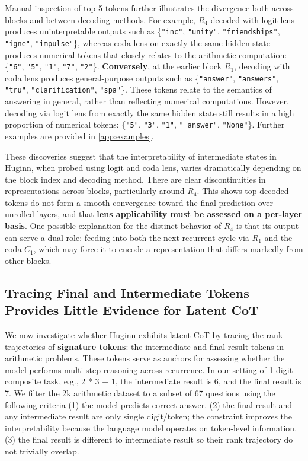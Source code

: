 \documentclass{article} %
\begin{document}
Manual inspection of top-5 tokens further illustrates the divergence both across blocks and between decoding methods. For example, $R_4$ decoded with logit lens produces uninterpretable outputs such as \{\texttt{"inc"}, \texttt{"unity"}, \texttt{"friendships"}, \texttt{"igne"}, \texttt{"impulse"}\}, whereas coda lens on exactly the same hidden state produces numerical tokens that closely relates to the arithmetic computation: \{\texttt{"6"}, \texttt{"5"}, \texttt{"1"}, \texttt{"7"}, \texttt{"2"}\}. \textbf{Conversely}, at the earlier block $R_1$, decoding with coda lens produces general-purpose outputs such as \{\texttt{"answer"}, \texttt{"answers"}, \texttt{"tru"}, \texttt{"clarification"}, \texttt{"spa"}\}. These tokens relate to the semantics of answering in general, rather than reflecting numerical computations. However, decoding via logit lens from exactly the same hidden state still results in a high proportion of numerical tokens: \{\texttt{"5"}, \texttt{"3"}, \texttt{"1"}, \texttt{" answer"}, \texttt{"None"}\}. Further examples are provided in \cref{app:examples}.


These discoveries suggest that the interpretability of intermediate states in Huginn, when probed using logit and coda lens, varies dramatically depending on the block index and decoding method. There are clear discontinuities in representations across blocks, particularly around $R_4$. This shows top decoded tokens do not form a smooth convergence toward the final prediction over unrolled layers, and that \textbf{lens applicability must be assessed on a per-layer basis}. One possible explanation for the distinct behavior of $R_4$ is that its output can serve a dual role: feeding into both the next recurrent cycle via $R_1$ and the coda $C_1$, which may force it to encode a representation that differs markedly from other blocks.


\subsection{Tracing Final and Intermediate Tokens Provides Little Evidence for Latent CoT}\label{sec:trace}
We now investigate whether Huginn exhibits latent CoT by tracing the rank trajectories of \textbf{signature tokens}: the intermediate and final result tokens in arithmetic problems. These tokens serve as anchors for assessing whether the model performs multi-step reasoning across recurrence. In our setting of 1-digit composite task, e.g., 2 * 3 + 1, the intermediate result is 6, and the final result is 7. We filter the 2k arithmetic dataset to a subset of 67 questions using the following criteria (1) the model predicts correct answer. (2) the final result and any intermediate result are only single digit/token; the constraint improves the interpretability because the language model operates on token-level information. (3) the final result is different to intermediate result so their rank trajectory do not trivially overlap. 
\end{document}
